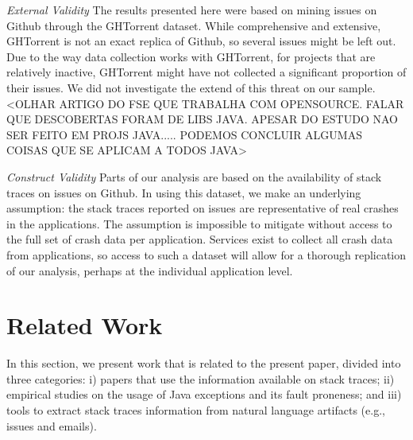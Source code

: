 \documentclass[conference]{IEEEtran}
\begin{document}
\noindent\emph{External Validity} The results presented here were based on mining
issues on Github through the GHTorrent dataset. While comprehensive and
extensive, GHTorrent is not an exact replica of Github, so several issues might
be left out. Due to the way data collection works with GHTorrent, for projects
that are relatively inactive, GHTorrent might have not collected a significant
proportion of their issues. We did not investigate the extend of this threat on
our sample.
<OLHAR ARTIGO DO FSE QUE TRABALHA COM OPENSOURCE.
FALAR QUE DESCOBERTAS FORAM DE LIBS JAVA. APESAR DO ESTUDO NAO SER FEITO EM PROJS JAVA.....
PODEMOS CONCLUIR ALGUMAS COISAS QUE SE APLICAM A TODOS JAVA>

\noindent\emph{Construct Validity} Parts of our analysis are based on the availability of stack traces on issues on
Github. In using this dataset, we make an underlying assumption: the
stack traces reported on issues are representative of real crashes in
the applications. The assumption is impossible to mitigate without access to
the full set of crash data per application. Services exist to collect all
crash data from applications, so access to such a dataset will allow for
a thorough replication of our analysis, perhaps at the individual application
level.

\section{Related Work}
\label{sec:rele}

In this section, we present work that is related to the present paper, divided into
three categories: i) papers that use the information available on stack traces;
ii) empirical studies on the usage of Java exceptions and its fault proneness;
and iii) tools to extract stack traces information from natural language artifacts
(e.g., issues and emails).
\end{document}
